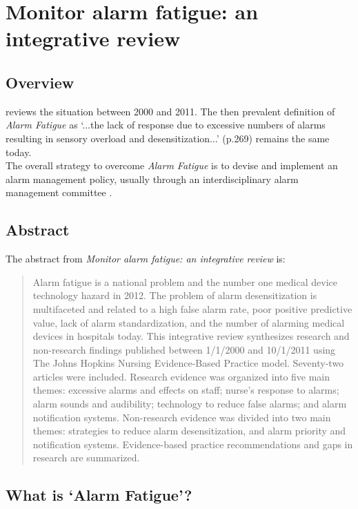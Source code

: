 \chapter{Monitor alarm fatigue: an integrative review}

\section{Overview}

\citet{cvach2012monitor} reviews the situation between 2000 and 2011. The then prevalent definition of \textit{Alarm Fatigue} as `...the lack of response due to excessive numbers of alarms resulting in sensory overload and desensitization...' (p.269) remains the same today. \\

The overall strategy to overcome \textit{Alarm Fatigue} is to devise and implement an alarm management policy, usually through an interdisciplinary alarm management committee \citet[p.273]{cvach2012monitor}.

\section{Abstract}

The abstract from \textit{Monitor alarm fatigue: an integrative review} \citet[p.268]{cvach2012monitor} is:

\begin{quotation}
	Alarm fatigue is a national problem and the number one medical device technology hazard in 2012. The problem of alarm desensitization is multifaceted and related to a high false alarm rate, poor positive predictive value, lack of alarm standardization, and the number of alarming medical devices in hospitals today. This integrative review synthesizes research and non-research findings published between 1/1/2000 and 10/1/2011 using The Johns Hopkins Nursing Evidence-Based Practice model. Seventy-two articles were included. Research evidence was organized into five main themes: excessive alarms and effects on staff; nurse's response to alarms; alarm sounds and audibility; technology to reduce false alarms; and alarm notification systems. Non-research evidence was divided into two main themes: strategies to reduce alarm desensitization, and alarm priority and notification systems. Evidence-based practice recommendations and gaps in research are summarized.
\end{quotation}

\section{What is `Alarm Fatigue'?}

